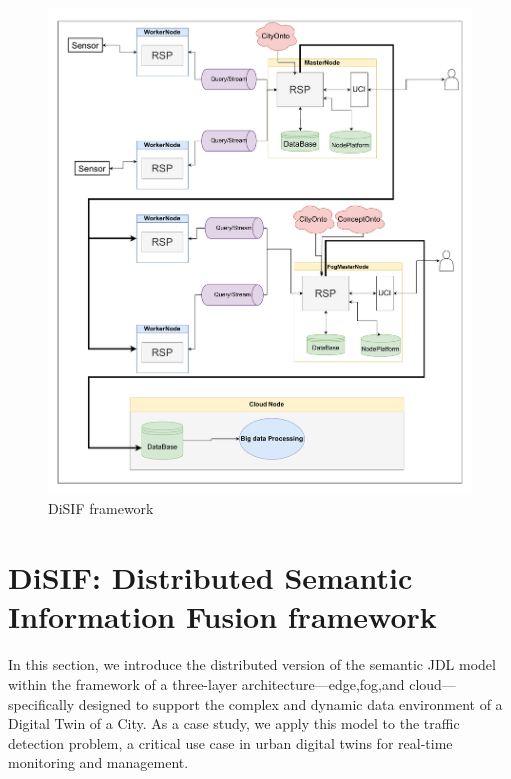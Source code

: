 \documentclass[5p,times]{elsarticle}
\begin{document}
\begin{figure}[t]
  \centering
  \includegraphics[width=\columnwidth]{AllinOneFrameWork_modified.drawio.pdf}
  \caption{DiSIF framework}
  \label{fig:overall}
\end{figure}









\section{DiSIF: Distributed Semantic Information Fusion framework}


In this section, we introduce the distributed version of the
semantic JDL model within the framework of a three-layer architecture—edge,fog,and 
cloud— specifically designed to support
the complex and dynamic data environment of a Digital Twin
of a City. As a case study, we apply this model to the traffic
detection problem, a critical use case in urban digital twins for
real-time monitoring and management.
\end{document}
